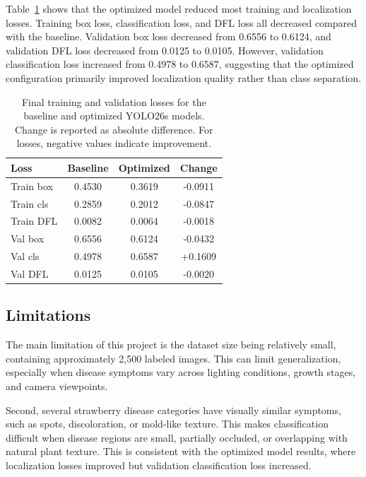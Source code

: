 \documentclass[10pt,twocolumn,letterpaper]{article}
\begin{document}
Table~\ref{tab:loss_comparison} shows that the optimized model reduced most training and localization losses. Training box loss, classification loss, and DFL loss all decreased compared with the baseline. Validation box loss decreased from 0.6556 to 0.6124, and validation DFL loss decreased from 0.0125 to 0.0105. However, validation classification loss increased from 0.4978 to 0.6587, suggesting that the optimized configuration primarily improved localization quality rather than class separation.

\begin{table}[!htbp]
  \centering
  \small
  \begin{tabular}{@{}lccc@{}}
    \toprule
    Loss & Baseline & Optimized & Change \\
    \midrule
    Train box & 0.4530 & 0.3619 & -0.0911 \\
    Train cls & 0.2859 & 0.2012 & -0.0847 \\
    Train DFL & 0.0082 & 0.0064 & -0.0018 \\
    Val box & 0.6556 & 0.6124 & -0.0432 \\
    Val cls & 0.4978 & 0.6587 & +0.1609 \\
    Val DFL & 0.0125 & 0.0105 & -0.0020 \\
    \bottomrule
  \end{tabular}
  \caption{Final training and validation losses for the baseline and optimized YOLO26s models. Change is reported as absolute difference. For losses, negative values indicate improvement.}
  \label{tab:loss_comparison}
\end{table}

\subsection{Limitations}

The main limitation of this project is the dataset size being relatively small, containing approximately 2,500 labeled images. This can limit generalization, especially when disease symptoms vary across lighting conditions, growth stages, and camera viewpoints.

Second, several strawberry disease categories have visually similar symptoms, such as spots, discoloration, or mold-like texture. This makes classification difficult when disease regions are small, partially occluded, or overlapping with natural plant texture. This is consistent with the optimized model results, where localization losses improved but validation classification loss increased.
\end{document}
